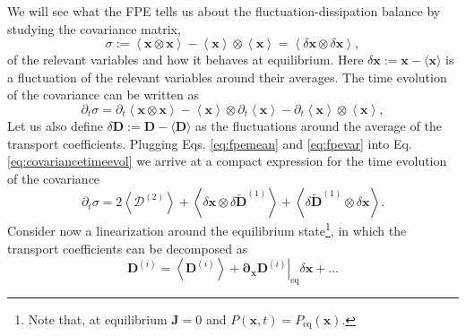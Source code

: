 \documentclass[ twoside,openright,titlepage,numbers=noenddot,%
headinclude,footinclude,cleardoublepage=empty,abstract=on,
BCOR=5mm,paper=b5,fontsize=11pt, dvipsnames
]{scrreprt}
\renewcommand{\vec}[1]{\bm{#1}}
\newcommand{\tens}[1]{\bm{\mathcal{#1}}}
\begin{document}
We will see what the \gls{FPE} tells us about the fluctuation-dissipation balance by studying the covariance matrix,
\begin{equation}
  \label{eq:covariance}
\tens{\sigma} := \left\langle\vec{x}\otimes\vec{x}\right\rangle-\left\langle\vec{x}\right\rangle\otimes\left\langle\vec{x}\right\rangle=\left\langle \delta\vec{x}\otimes\delta\vec{x}\right\rangle,
\end{equation}
of the relevant variables and how it behaves at equilibrium. Here $\delta\vec{x} := \vec{x} - \langle\vec{x}\rangle$ is a fluctuation of the relevant variables around their averages.
The time evolution of the covariance can be written as
\begin{equation}
  \label{eq:covariancetimeevol}
\partial_t\tens{\sigma} =\partial_t\left\langle\vec{x}\otimes\vec{x}\right\rangle-\left\langle\vec{x}\right\rangle\otimes\partial_t\left\langle\vec{x}\right\rangle -\partial_t\left\langle\vec{x}\right\rangle\otimes\left\langle\vec{x}\right\rangle,
\end{equation}
Let us also define $\delta\vec{D} := \vec{D} - \langle\vec{D}\rangle$ as the fluctuations around the average of the transport coefficients.
Plugging Eqs. \eqref{eq:fpemean} and \eqref{eq:fpevar} into Eq. \eqref{eq:covariancetimeevol} we arrive at a compact expression for the time evolution of the covariance
\begin{equation}
  \label{eq:fpefdsigma}
  \partial_t\tens{\sigma} = 2\left\langle\tens{D}^{(2)} \right\rangle + \left\langle \delta\vec{x}\otimes\delta\widetilde{\vec{D}}^{(1)} \right\rangle + \left\langle \delta\widetilde{\vec{D}}^{(1)}\otimes\delta\vec{x} \right\rangle.
\end{equation}
Consider now a linearization around the equilibrium state\footnote{Note that, at equilibrium $\vec{J}=0$ and $P(\vec{x},t) = P_{\text{eq}}(\vec{x})$.}, in which the transport coefficients can be decomposed as
\begin{equation}
  \label{eq:fpefdcoeff}
  \vec{D}^{(i)} = \left\langle\vec{D}^{(i)}\right\rangle + \left.\vec{\partial}_{\vec{x}}\vec{D}^{(i)}\right|_{\text{eq}}\delta\vec{x}+\dots
\end{equation}
\end{document}
